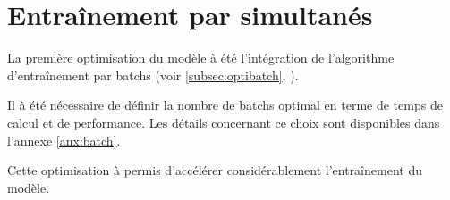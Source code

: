 \section{Entraînement par  simultanés}
La première optimisation du modèle à été l'intégration de l'algorithme d'entraînement par \glspl{batch} (voir \autoref{subsec:optibatch}, ).

Il à été nécessaire de définir la nombre de \glspl{batch} optimal en terme de temps de calcul et de performance. Les détails concernant ce choix sont disponibles dans l'annexe \ref{anx:batch}.

Cette optimisation à permis d'accélérer considérablement l'entraînement du modèle.